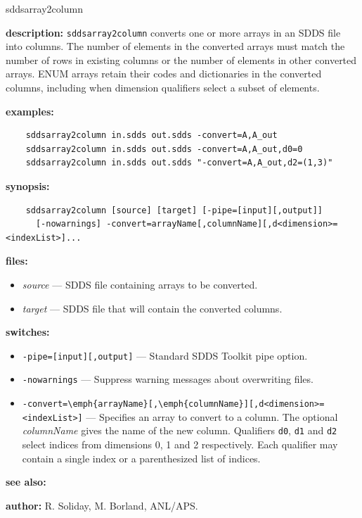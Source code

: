 \begin{sddsprog}{sddsarray2column}
  \item \textbf{description:} \verb|sddsarray2column| converts one or more arrays in an SDDS file into columns. The number of elements in the converted arrays must match the number of rows in existing columns or the number of elements in other converted arrays.
  ENUM arrays retain their codes and dictionaries in the converted columns, including when dimension qualifiers select a subset of elements.
  \item \textbf{examples:}
    \begin{verbatim}
    sddsarray2column in.sdds out.sdds -convert=A,A_out
    sddsarray2column in.sdds out.sdds -convert=A,A_out,d0=0
    sddsarray2column in.sdds out.sdds "-convert=A,A_out,d2=(1,3)"
    \end{verbatim}
  \item \textbf{synopsis:}
    \begin{verbatim}
    sddsarray2column [source] [target] [-pipe=[input][,output]]
      [-nowarnings] -convert=arrayName[,columnName][,d<dimension>=<indexList>]...
    \end{verbatim}
  \item \textbf{files:}
    \begin{itemize}
      \item {\em source} --- SDDS file containing arrays to be converted.
      \item {\em target} --- SDDS file that will contain the converted columns.
    \end{itemize}
  \item \textbf{switches:}
    \begin{itemize}
      \item \verb|-pipe=[input][,output]| --- Standard SDDS Toolkit pipe option.
      \item \verb|-nowarnings| --- Suppress warning messages about overwriting files.
      \item \verb|-convert=\emph{arrayName}[,\emph{columnName}][,d<dimension>=<indexList>]| --- Specifies an array to convert to a column. The optional \emph{columnName} gives the name of the new column. Qualifiers \verb|d0|, \verb|d1| and \verb|d2| select indices from dimensions 0, 1 and 2 respectively. Each qualifier may contain a single index or a parenthesized list of indices.
    \end{itemize}
  \item \textbf{see also:} 
  \item \textbf{author:} R. Soliday, M. Borland, ANL/APS.
\end{sddsprog}

